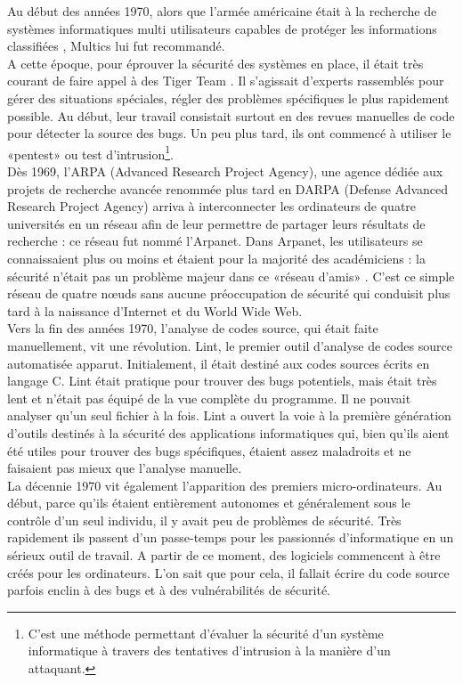 Au début des années 1970, alors que l’armée américaine était à la recherche de systèmes informatiques multi utilisateurs capables de protéger les informations classifiées \cite{b2}, Multics lui fut recommandé.\\
A cette époque, pour éprouver la sécurité des systèmes en place, il était très courant de faire appel à des Tiger Team \cite{infosec-history}. Il s’agissait d’experts rassemblés pour gérer des situations spéciales, régler des problèmes spécifiques le plus rapidement possible. Au début, leur travail consistait surtout en des revues manuelles de code pour détecter la source des bugs. Un peu plus tard, ils ont commencé à utiliser le «pentest» ou test d’intrusion\footnote{C’est une méthode permettant d’évaluer la sécurité d’un système informatique à travers des tentatives d’intrusion à la manière d’un attaquant.}.\\ 
Dès 1969, l’ARPA (Advanced Research Project Agency), une agence dédiée aux projets de recherche avancée renommée plus tard en DARPA (Defense Advanced Research Project Agency) arriva à interconnecter les ordinateurs de quatre universités en un réseau afin de leur permettre de partager leurs résultats de recherche : ce réseau fut nommé l’Arpanet. Dans Arpanet, les utilisateurs se connaissaient plus ou moins et étaient pour la majorité des académiciens : la sécurité n’était pas un problème majeur dans ce «réseau d’amis» \cite{arpanet}. C’est ce simple réseau de quatre nœuds sans aucune préoccupation de sécurité qui conduisit plus tard à la naissance d’Internet et du World Wide Web. \\
Vers la fin des années 1970, l’analyse de codes source, qui était faite manuellement, vit une révolution. Lint, le premier outil d’analyse de codes source automatisée apparut. Initialement, il était destiné aux codes sources écrits en langage C. Lint était pratique pour trouver des bugs potentiels, mais était très lent et n'était pas équipé de la vue complète du programme. Il ne pouvait analyser qu'un seul fichier à la fois. Lint a ouvert la voie à la première génération d’outils destinés à la sécurité des applications informatiques qui, bien qu'ils aient été utiles pour trouver des bugs spécifiques, étaient assez maladroits et ne faisaient pas mieux que l'analyse manuelle.\\
La décennie 1970 vit également l’apparition des premiers micro-ordinateurs. Au début, parce qu’ils étaient entièrement autonomes et généralement sous le contrôle d'un seul individu, il y avait peu de problèmes de sécurité. Très rapidement ils passent d'un passe-temps pour les passionnés d'informatique en un sérieux outil de travail. A partir de ce moment, des logiciels commencent à être créés pour les ordinateurs. L’on sait que pour cela, il fallait écrire du code source parfois enclin à des bugs et à des vulnérabilités de sécurité.\\
